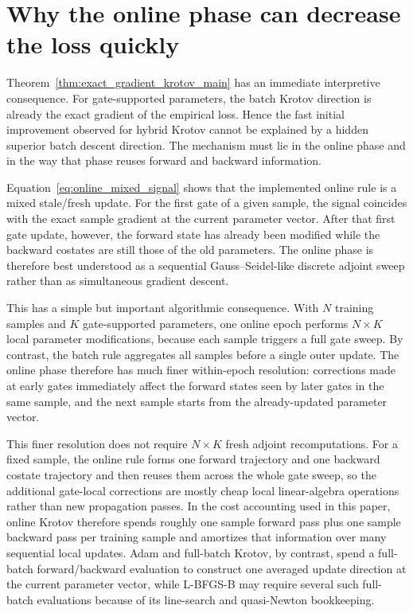 \documentclass[aps,prb,10pt,twocolumn,superscriptaddress]{revtex4-2}
\begin{document}
\section{Why the online phase can decrease the loss quickly}

Theorem~\ref{thm:exact_gradient_krotov_main} has an immediate interpretive consequence. For gate-supported parameters, the batch Krotov direction is already the exact gradient of the empirical loss. Hence the fast initial improvement observed for hybrid Krotov cannot be explained by a hidden superior batch descent direction. The mechanism must lie in the online phase and in the way that phase reuses forward and backward information.

Equation~\eqref{eq:online_mixed_signal} shows that the implemented online rule is a mixed stale/fresh update. For the first gate of a given sample, the signal coincides with the exact sample gradient at the current parameter vector. After that first gate update, however, the forward state has already been modified while the backward costates are still those of the old parameters. The online phase is therefore best understood as a sequential Gauss--Seidel-like discrete adjoint sweep rather than as simultaneous gradient descent.

This has a simple but important algorithmic consequence. With \(N\) training samples and \(K\) gate-supported parameters, one online epoch performs \(N\times K\) local parameter modifications, because each sample triggers a full gate sweep. By contrast, the batch rule aggregates all samples before a single outer update. The online phase therefore has much finer within-epoch resolution: corrections made at early gates immediately affect the forward states seen by later gates in the same sample, and the next sample starts from the already-updated parameter vector.

This finer resolution does not require \(N\times K\) fresh adjoint recomputations. For a fixed sample, the online rule forms one forward trajectory and one backward costate trajectory and then reuses them across the whole gate sweep, so the additional gate-local corrections are mostly cheap local linear-algebra operations rather than new propagation passes. In the cost accounting used in this paper, online Krotov therefore spends roughly one sample forward pass plus one sample backward pass per training sample and amortizes that information over many sequential local updates. Adam and full-batch Krotov, by contrast, spend a full-batch forward/backward evaluation to construct one averaged update direction at the current parameter vector, while L-BFGS-B may require several such full-batch evaluations because of its line-search and quasi-Newton bookkeeping.
\end{document}
